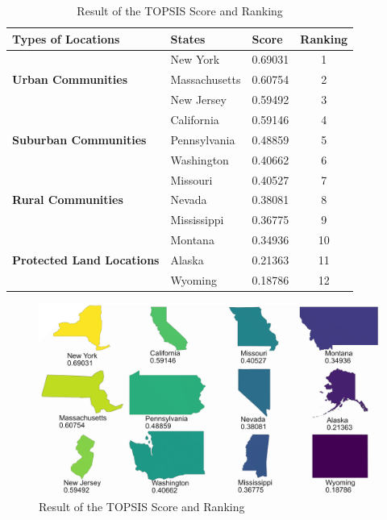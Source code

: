 \begin{table}[H] \centering
    \caption{Result of the TOPSIS Score and Ranking}
    \begin{tabular}{llll}
        \toprule
        Types of Locations & States & Score & Ranking\\ \hline\hline
        \multirow{3}{*}{\textbf{Urban Communities}}& New York & 0.69031 & \multicolumn{1}{c}{1}\\
                            &  Massachusetts & 0.60754 & \multicolumn{1}{c}{2}\\
                            & New Jersey & 0.59492& \multicolumn{1}{c}{3}\\\hline
        \multirow{3}{*}{\textbf{Suburban Communities}} & California & 0.59146 & \multicolumn{1}{c}{4}\\
                            & Pennsylvania & 0.48859 & \multicolumn{1}{c}{5}\\
                           & Washington & 0.40662 & \multicolumn{1}{c}{6}\\\hline
        \multirow{3}{*}{\textbf{Rural Communities}}& Missouri & 0.40527 &\multicolumn{1}{c}{7}\\
                            & Nevada & 0.38081 & \multicolumn{1}{c}{8}\\
                            & Mississippi & 0.36775 & \multicolumn{1}{c}{9}\\\hline
        \multirow{3}{*}{\textbf{Protected Land Locations}}& Montana & 0.34936 & \multicolumn{1}{c}{10}\\
                            & Alaska & 0.21363  & \multicolumn{1}{c}{11}\\
                           & Wyoming & 0.18786 & \multicolumn{1}{c}{12}\\
        \bottomrule
    \end{tabular}
\end{table}

\begin{figure}[H]\centering
    \includegraphics[width=1\textwidth]{figures/result.png}
    \caption{Result of the TOPSIS Score and Ranking} \label{fig:figure6}
\end{figure}